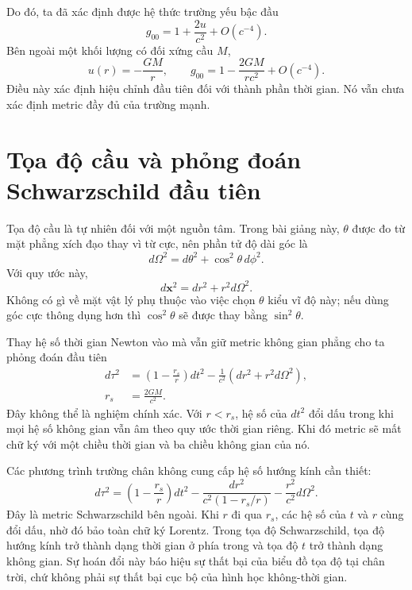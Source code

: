Do đó, ta đã xác định được hệ thức trường yếu bậc đầu
\begin{equation}
g_{00}=1+\frac{2u}{c^2}+O(c^{-4}).
\label{eq:l5-g00-newton}
\end{equation}
Bên ngoài một khối lượng có đối xứng cầu \(M\),
\begin{equation}
u(r)=-\frac{GM}{r},
\qquad
g_{00}=1-\frac{2GM}{rc^2}+O(c^{-4}).
\label{eq:l5-g00-spherical}
\end{equation}
Điều này xác định hiệu chỉnh đầu tiên đối với thành phần thời gian. Nó vẫn chưa xác định metric đầy đủ của trường mạnh.

\section{Tọa độ cầu và phỏng đoán Schwarzschild đầu tiên}

Tọa độ cầu là tự nhiên đối với một nguồn tâm. Trong bài giảng này, \(\theta\) được đo từ mặt phẳng xích đạo thay vì từ cực, nên phần tử độ dài góc là
\begin{equation}
d\Omega^2=d\theta^2+\cos^2\theta\,d\phi^2.
\label{eq:l5-angular-metric}
\end{equation}
Với quy ước này,
\begin{equation}
d\mathbf{x}^2=dr^2+r^2d\Omega^2.
\label{eq:l5-flat-spherical}
\end{equation}
Không có gì về mặt vật lý phụ thuộc vào việc chọn \(\theta\) kiểu vĩ độ này; nếu dùng góc cực thông dụng hơn thì \(\cos^2\theta\) sẽ được thay bằng
\(\sin^2\theta\).

Thay hệ số thời gian Newton vào mà vẫn giữ metric không gian phẳng cho ta phỏng đoán đầu tiên
\begin{equation}
\begin{aligned}
d\tau^2
&=\left(1-\frac{r_s}{r}\right)dt^2
-\frac{1}{c^2}\left(dr^2+r^2d\Omega^2\right),\\
r_s&=\frac{2GM}{c^2}.
\end{aligned}
\label{eq:l5-naive-schwarzschild}
\end{equation}
Đây không thể là nghiệm chính xác. Với \(r<r_s\), hệ số của \(dt^2\) đổi dấu trong khi mọi hệ số không gian vẫn âm theo quy ước thời gian riêng. Khi đó metric sẽ mất chữ ký với một chiều thời gian và ba chiều không gian của nó.

Các phương trình trường chân không cung cấp hệ số hướng kính cần thiết:
\begin{equation}
\boxed{
d\tau^2
=\left(1-\frac{r_s}{r}\right)dt^2
-\frac{dr^2}{c^2\left(1-r_s/r\right)}
-\frac{r^2}{c^2}d\Omega^2.
}
\label{eq:l5-schwarzschild}
\end{equation}
Đây là metric Schwarzschild bên ngoài. Khi \(r\) đi qua \(r_s\), các hệ số của \(t\) và \(r\) cùng đổi dấu, nhờ đó bảo toàn chữ ký Lorentz. Trong tọa độ Schwarzschild, tọa độ hướng kính trở thành dạng thời gian ở phía trong và tọa độ \(t\) trở thành dạng không gian. Sự hoán đổi này báo hiệu sự thất bại của biểu đồ tọa độ tại chân trời, chứ không phải sự thất bại cục bộ của hình học không-thời gian.

